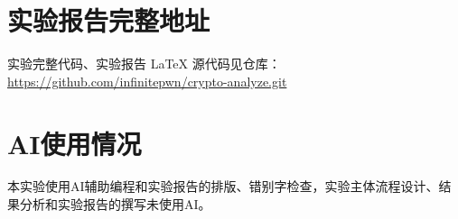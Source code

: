 \section{实验报告完整地址}
实验完整代码、实验报告 \LaTeX{} 源代码见仓库：
\url{https://github.com/infinitepwn/crypto-analyze.git}


\section{AI使用情况}
本实验使用AI辅助编程和实验报告的排版、错别字检查，实验主体流程设计、结果分析和实验报告的撰写未使用AI。